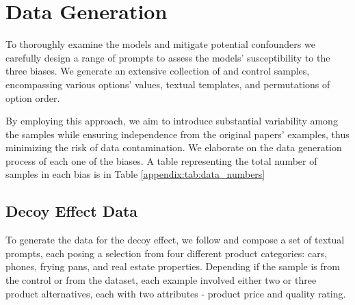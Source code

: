 

\section{Data Generation}
\label{sec:appendix_data_generation}




To thoroughly examine the models and mitigate potential confounders we carefully design a range of prompts to assess the models' susceptibility to the three biases.
We generate an extensive collection of \biaseddataset{} and control samples, encompassing various options' values, textual templates, and permutations of option order.

By employing this approach, we aim to introduce substantial variability among the samples while ensuring independence from the original papers' examples, thus minimizing the risk of data contamination.
We elaborate on the data generation process of each one of the biases.
A table representing the total number of samples in each bias is in Table \ref{appendix:tab:data_numbers}


\subsection{Decoy Effect Data}
\label{subsec:data_gen_decoy}
To generate the data for the decoy effect, we follow \cite{huber1982adding} and compose a set of textual prompts, each posing a selection from four different product categories: cars, phones, frying pans, and real estate properties.
Depending if the sample is from the control or from the \biaseddataset{} dataset, each example involved either two or three product alternatives, each with two attributes - product price and quality rating.


